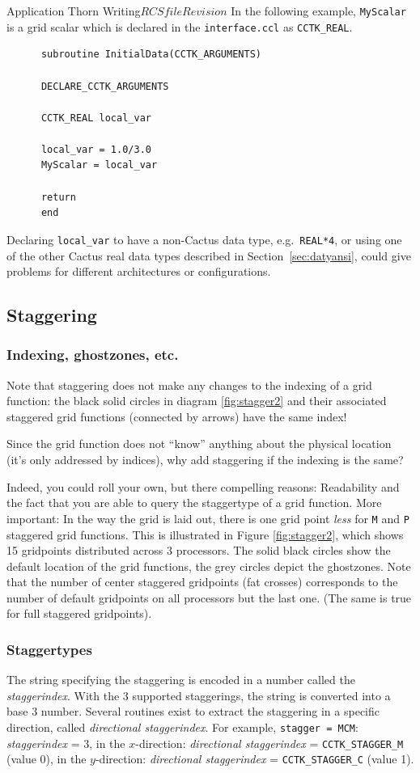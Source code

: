 \begin{cactuspart}{Application Thorn Writing}{$RCSfile$}{$Revision$}
In the following example, \verb|MyScalar| is a grid scalar which
is declared in the \texttt{interface.ccl} as \texttt{CCTK\_REAL}.
%
\begin{verbatim}
      subroutine InitialData(CCTK_ARGUMENTS)

      DECLARE_CCTK_ARGUMENTS

      CCTK_REAL local_var

      local_var = 1.0/3.0
      MyScalar = local_var

      return
      end
\end{verbatim}
%
Declaring \texttt{local\_var} to have a non-Cactus data type, e.g.\
\texttt{REAL*4}, or using one of the other Cactus real data types
described in Section~\ref{sec:datyansi}, could give problems for
different architectures or configurations.

\subsection{Staggering}
\label{sec:st}

\subsubsection{Indexing, ghostzones, etc.}
Note that staggering does not make any changes to the indexing of a
grid function: the black solid circles in diagram \ref{fig:stagger2} and their
associated staggered grid functions (connected by arrows) have the same index!

Since the grid function does not ``know'' anything about the physical
location (it's only addressed by indices), why add staggering if the
indexing is the same?

Indeed, you could roll your own, but there compelling reasons:
Readability and the fact that you are able to query the staggertype of a
grid function. More important: In the way the grid is laid out, there is one grid
point \emph{less} for \texttt{M} and \texttt{P} staggered grid functions. This is
illustrated in Figure \ref{fig:stagger2}, which shows 15 gridpoints distributed
across 3 processors. The solid black circles show the default
location of the grid functions, the grey circles depict the ghostzones.
Note that the number of center staggered gridpoints (fat crosses)
corresponds to the number of default gridpoints on all processors but
the last one. (The same is true for full staggered gridpoints).

\subsubsection{Staggertypes}
The string specifying the staggering is encoded in a number called
the \textit{staggerindex}. With the 3 supported staggerings, the string
is converted into a base 3 number. Several routines exist to extract the
staggering in a specific direction, called \textit{directional
staggerindex}. For example, \texttt{stagger = MCM}: \textit{staggerindex} = 3, in the
$x$-direction: \textit{directional staggerindex} = \texttt{CCTK\_STAGGER\_M} (value 0),
in the
$y$-direction: \textit{directional staggerindex} = \texttt{CCTK\_STAGGER\_C} (value 1).


\end{cactuspart}
